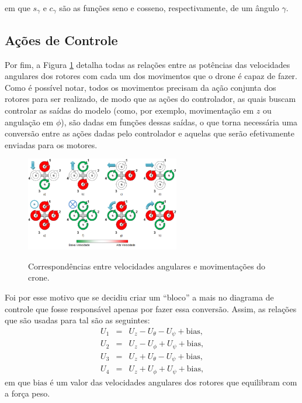 \vspace{+0.3cm}

\noindent em que $s_{\gamma}$ e $c_{\gamma}$ são as funções seno e cosseno, respectivamente, de um ângulo $\gamma$.

\subsection{Ações de Controle \label{sec:ac_control}}

Por fim, a Figura \ref{fig:movimento} detalha todas as relações entre as potências das velocidades angulares 
dos rotores com cada um dos movimentos que o drone é capaz de fazer.
Como é possível notar, todos os movimentos precisam da ação conjunta dos rotores para ser realizado, de modo que 
as ações do controlador, as quais buscam controlar as saídas do modelo (como, por exemplo, movimentação em $z$ ou 
angulação em $\phi$), são dadas em funções dessas saídas, o que torna necessária uma conversão entre as ações dadas 
pelo controlador e aquelas que serão efetivamente enviadas para os motores.

\begin{figure}[h!]
    \centering
    \caption{Correspondências entre velocidades angulares e movimentações do crone. \cite{usp}}
    \includegraphics[width=0.6\textwidth]{figs/mov_drone.png}
    \label{fig:movimento}
\end{figure}

\pagebreak

Foi por esse motivo que se decidiu criar 
um ``bloco'' a mais no diagrama de controle que fosse responsável apenas por fazer essa conversão. Assim, as relações 
que são usadas para tal são as seguintes:
\begin{eqnarray}
    U_1 &=& U_z - U_\theta - U_\psi + \text{bias,} \\
    U_2 &=& U_z - U_\phi + U_\psi + \text{bias,} \\
    U_3 &=& U_z + U_\theta - U_\psi + \text{bias,} \\
    U_4 &=& U_z + U_\phi + U_\psi + \text{bias,}
\end{eqnarray}
\noindent em que $\text{bias}$ é um valor das velocidades angulares dos rotores que equilibram com a força peso.